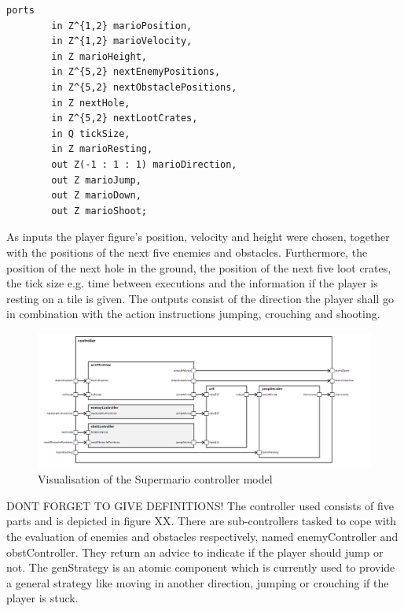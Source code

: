 \begin{lstlisting}[label=lst:marioWrapperInterface, caption=Interface of the Supermario Wrapper, morekeywords={ports, port, connect, in, out, instance, ->},
frame=single]
    ports   
        in Z^{1,2} marioPosition,
        in Z^{1,2} marioVelocity,
        in Z marioHeight,
        in Z^{5,2} nextEnemyPositions,
        in Z^{5,2} nextObstaclePositions,
        in Z nextHole,
        in Z^{5,2} nextLootCrates,
        in Q tickSize,
        in Z marioResting,
        out Z(-1 : 1 : 1) marioDirection,
        out Z marioJump,
        out Z marioDown,
        out Z marioShoot;
\end{lstlisting}

As inputs the player figure's position, velocity and height were chosen, together with the positions of the next five enemies and obstacles. Furthermore, the position of the next hole in the ground, the position of the next five loot crates, the tick size e.g. time between executions and the information if the player is resting on a tile is given.
The outputs consist of the direction the player shall go in combination with the action instructions jumping, crouching and shooting.

\begin{figure}
	\centering
	\includegraphics[scale=0.5]{pictures/haller_controller.PNG}
	\caption{Visualisation of the Supermario controller model}
	\label{fig:marioController}
\end{figure}

DONT FORGET TO GIVE DEFINITIONS!
The controller used consists of five parts and is depicted in figure XX. There are sub-controllers tasked to cope with the evaluation of enemies and obstacles respectively, named enemyController and obstController. They return an advice to indicate if the player should jump or not. The genStrategy is an atomic component which is currently used to provide a general strategy like moving in another direction, jumping or crouching if the player is stuck. 

